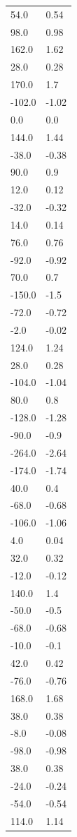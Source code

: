 \begin{longtable}{ll}
54.0 & 0.54 \\
98.0 & 0.98 \\
162.0 & 1.62 \\
28.0 & 0.28 \\
170.0 & 1.7 \\
-102.0 & -1.02 \\
0.0 & 0.0 \\
144.0 & 1.44 \\
-38.0 & -0.38 \\
90.0 & 0.9 \\
12.0 & 0.12 \\
-32.0 & -0.32 \\
14.0 & 0.14 \\
76.0 & 0.76 \\
-92.0 & -0.92 \\
70.0 & 0.7 \\
-150.0 & -1.5 \\
-72.0 & -0.72 \\
-2.0 & -0.02 \\
124.0 & 1.24 \\
28.0 & 0.28 \\
-104.0 & -1.04 \\
80.0 & 0.8 \\
-128.0 & -1.28 \\
-90.0 & -0.9 \\
-264.0 & -2.64 \\
-174.0 & -1.74 \\
40.0 & 0.4 \\
-68.0 & -0.68 \\
-106.0 & -1.06 \\
4.0 & 0.04 \\
32.0 & 0.32 \\
-12.0 & -0.12 \\
140.0 & 1.4 \\
-50.0 & -0.5 \\
-68.0 & -0.68 \\
-10.0 & -0.1 \\
42.0 & 0.42 \\
-76.0 & -0.76 \\
168.0 & 1.68 \\
38.0 & 0.38 \\
-8.0 & -0.08 \\
-98.0 & -0.98 \\
38.0 & 0.38 \\
-24.0 & -0.24 \\
-54.0 & -0.54 \\
114.0 & 1.14 \\

\end{longtable}
